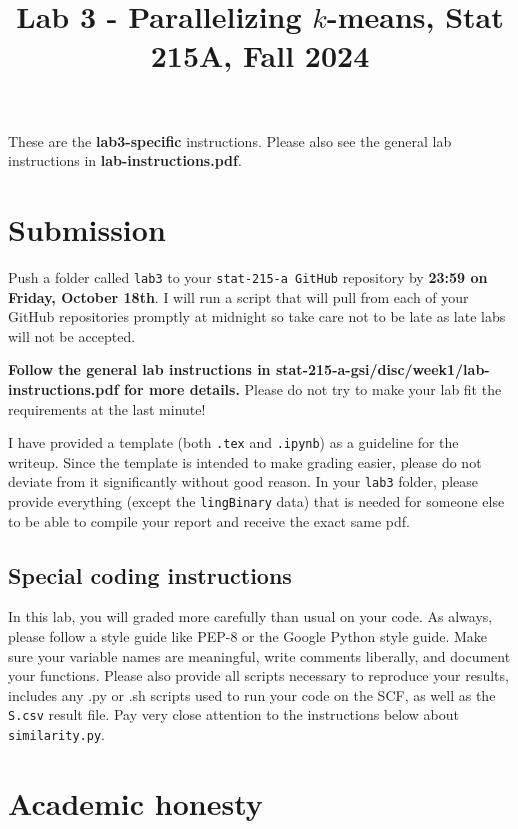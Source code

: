 \documentclass[letterpaper,12pt]{article}
\title{Lab 3 - Parallelizing $k$-means, Stat 215A, Fall 2024\vspace{-2em}}
\date{}
\begin{document}
\maketitle

These are the \textbf{lab3-specific} instructions. Please also see the general lab instructions in \textbf{lab-instructions.pdf}.

\tableofcontents

\section{Submission}
Push a folder called \texttt{lab3} to your \texttt{stat-215-a GitHub} repository by \textbf{23:59 on Friday, October 18th}. I will run a script that will pull from each of your GitHub repositories promptly at midnight so take care not to be late as late labs will not be accepted.

\textbf{Follow the general lab instructions in stat-215-a-gsi/disc/week1/lab-instructions.pdf for more details.} Please do not try to make your lab fit the requirements at the last minute!

I have provided a template (both \texttt{.tex} and \texttt{.ipynb}) as a guideline for the writeup. Since the template is intended to make grading easier, please do not deviate from it significantly without good reason. In your \texttt{lab3} folder, please provide everything (except the \texttt{lingBinary} data) that is needed for someone else to be able to compile your report and receive the exact same pdf.

\subsection{Special coding instructions}
In this lab, you will graded more carefully than usual on your code. As always, please follow a style guide like PEP-8 or the Google Python style guide. Make sure your variable names are meaningful, write comments liberally, and document your functions. Please also provide all scripts necessary to reproduce your results, includes any .py or .sh scripts used to run your code on the SCF, as well as the \texttt{S.csv} result file. Pay very close attention to the instructions below about \texttt{similarity.py}.

\section{Academic honesty}
\end{document}
